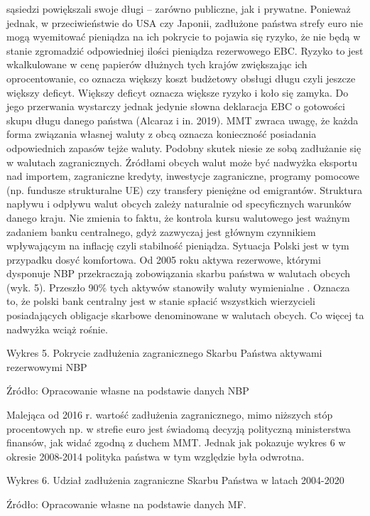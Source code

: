 \documentclass[
]{book}
\begin{document}
sąsiedzi powiększali swoje długi -- zarówno publiczne, jak i prywatne. Ponieważ jednak, w przeciwieństwie do USA czy Japonii, zadłużone państwa strefy euro nie mogą wyemitować pieniądza na ich pokrycie to pojawia się ryzyko, że nie będą w stanie zgromadzić odpowiedniej ilości pieniądza rezerwowego EBC. Ryzyko to jest wkalkulowane w cenę papierów dłużnych tych krajów zwiększając ich oprocentowanie, co oznacza większy koszt budżetowy obsługi długu czyli jeszcze większy deficyt. Większy deficyt oznacza większe ryzyko i koło się zamyka. Do jego przerwania wystarczy jednak jedynie słowna deklaracja EBC o gotowości skupu długu danego państwa (Alcaraz i in. 2019). MMT zwraca uwagę, że każda forma związania własnej waluty z obcą oznacza konieczność posiadania odpowiednich zapasów tejże waluty. Podobny skutek niesie ze sobą zadłużanie się w walutach zagranicznych. Źródłami obcych walut może być nadwyżka eksportu nad importem, zagraniczne kredyty, inwestycje zagraniczne, programy pomocowe (np. fundusze strukturalne UE) czy transfery pieniężne od emigrantów. Struktura napływu i odpływu walut obcych zależy naturalnie od specyficznych warunków danego kraju. Nie zmienia to faktu, że kontrola kursu walutowego jest ważnym zadaniem banku centralnego, gdyż zazwyczaj jest głównym czynnikiem wpływającym na inflację czyli stabilność pieniądza. Sytuacja Polski jest w tym przypadku dosyć komfortowa. Od 2005 roku aktywa rezerwowe, którymi dysponuje NBP przekraczają zobowiązania skarbu państwa w walutach obcych (wyk. 5). Przeszło 90\% tych aktywów stanowiły waluty wymienialne . Oznacza to, że polski bank centralny jest w stanie spłacić wszystkich wierzycieli posiadających obligacje skarbowe denominowane w walutach obcych. Co więcej ta nadwyżka wciąż rośnie.

Wykres 5. Pokrycie zadłużenia zagranicznego Skarbu Państwa aktywami rezerwowymi NBP

Źródło: Opracowanie własne na podstawie danych NBP

Malejąca od 2016 r. wartość zadłużenia zagranicznego, mimo niższych stóp procentowych np. w strefie euro jest świadomą decyzją polityczną ministerstwa finansów, jak widać zgodną z duchem MMT. Jednak jak pokazuje wykres 6 w okresie 2008-2014 polityka państwa w tym względzie była odwrotna.

Wykres 6. Udział zadłużenia zagraniczne Skarbu Państwa w latach 2004-2020

Źródło: Opracowanie własne na podstawie danych MF.
\end{document}
